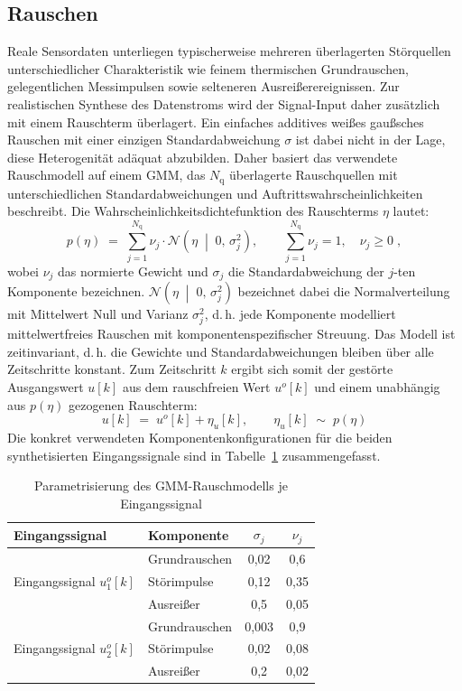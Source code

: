 \subsection{Rauschen} \label{sec:hinzufügen_von_rauschen}
%
Reale Sensordaten unterliegen typischerweise mehreren überlagerten Störquellen unterschiedlicher Charakteristik wie feinem thermischen Grundrauschen, gelegentlichen Messimpulsen sowie selteneren Ausreißerereignissen. Zur realistischen Synthese des Datenstroms wird der Signal-Input daher zusätzlich mit einem Rauschterm überlagert. Ein einfaches additives weißes gaußsches Rauschen mit einer einzigen Standardabweichung $\sigma$ ist dabei nicht in der Lage, diese Heterogenität adäquat abzubilden. Daher basiert das verwendete Rauschmodell auf einem \ac{GMM}, das $N_{\mathrm{q}}$ überlagerte Rauschquellen mit unterschiedlichen Standardabweichungen und Auftrittswahrscheinlichkeiten beschreibt. Die Wahrscheinlichkeitsdichtefunktion des Rauschterms $\eta$ lautet:
%
\begin{equation}
    p(\eta) \;=\; \sum_{j=1}^{N_{\mathrm{q}}} \nu_j \cdot
    \mathcal{N}\!\left(\eta \;\middle|\; 0,\, \sigma_j^2\right),
    \qquad \sum_{j=1}^{N_{\mathrm{q}}} \nu_j = 1,\quad \nu_j \geq 0 \; ,
    \label{eq:gmm_noise}
\end{equation}
%
wobei $\nu_j$ das normierte Gewicht und $\sigma_j$ die Standardabweichung der $j$-ten Komponente bezeichnen. $\mathcal{N}\!\left(\eta \;\middle|\; 0,\, \sigma_j^2\right)$ bezeichnet dabei die Normalverteilung mit Mittelwert Null und Varianz $\sigma_j^2$, d.\,h. jede Komponente modelliert mittelwertfreies Rauschen mit komponentenspezifischer Streuung. Das Modell ist zeitinvariant, d.\,h. die Gewichte und Standardabweichungen bleiben über alle Zeitschritte konstant.
Zum Zeitschritt $k$ ergibt sich somit der gestörte Ausgangswert $u[k]$ aus dem rauschfreien Wert $u^o[k]$ und einem unabhängig aus $p(\eta)$ gezogenen Rauschterm:
%
\begin{equation}
    u[k] \;=\; u^o[k] + \eta_u[k], \qquad
     \eta_u[k] \;\sim\; p(\eta)
    \label{eq:noisy_input}
\end{equation}
%
Die konkret verwendeten Komponentenkonfigurationen für die beiden synthetisierten Eingangssignale sind in Tabelle~\ref{tab:noise_components} zusammengefasst.
%
\begin{table}[ht]
\centering
\caption{Parametrisierung des \ac{GMM}-Rauschmodells je Eingangssignal}
\label{tab:noise_components}
\begin{tabular}{llcc}
\toprule
\textbf{Eingangssignal} & \textbf{Komponente} & $\sigma_j$ & $\nu_j$ \\
\midrule
\multirow{3}{*}{Eingangssignal $u^o_1[k]$}
    & Grundrauschen  & 0{,}02 & 0{,}6 \\
    & Störimpulse    & 0{,}12 & 0{,}35 \\
    & Ausreißer      & 0{,}5 & 0{,}05 \\
\midrule
\multirow{3}{*}{Eingangssignal $u^o_2[k]$}
    & Grundrauschen  & 0{,}003 & 0{,}9 \\
    & Störimpulse    & 0{,}02 & 0{,}08 \\
    & Ausreißer      & 0{,}2 & 0{,}02 \\
\bottomrule
\end{tabular}
\end{table}
